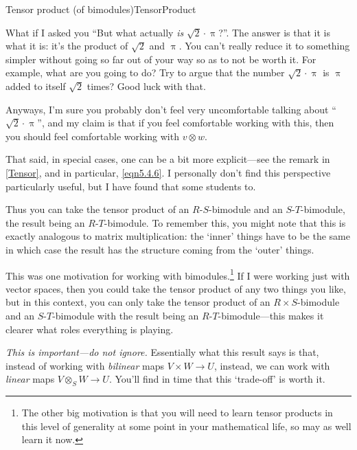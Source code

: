 \begin{thm}{Tensor product (of bimodules)}{TensorProduct}
\begin{rmk}
		What if I asked you ``But what actually \emph{is} $\sqrt{2}\cdot \uppi$?''.  The answer is that it is what it is:  it's the product of $\sqrt{2}$ and $\uppi$.  You can't really reduce it to something simpler without going so far out of your way so as to not be worth it.  For example, what are you going to do?  Try to argue that the number $\sqrt{2}\cdot \uppi$ is $\uppi$ added to itself $\sqrt{2}$ times?  Good luck with that.
		
		Anyways, I'm sure you probably don't feel very uncomfortable talking about ``$\sqrt{2}\cdot \uppi$'', and my claim is that if you feel comfortable working with this, then you should feel comfortable working with $v\otimes w$.
		
		That said, in special cases, one can be a bit more explicit---see the remark in \cref{Tensor}, and in particular, \eqref{eqn5.4.6}.  I personally don't find this perspective particularly useful, but I have found that some students to.
	\end{rmk}
	\begin{rmk}
		Thus you can take the tensor product of an $R$-$S$-bimodule and an $S$-$T$-bimodule, the result being an $R$-$T$-bimodule.  To remember this, you might note that this is exactly analogous to matrix multiplication:  the `inner' things have to be the same in which case the result has the structure coming from the `outer' things.
		
		This was one motivation for working with bimodules.\footnote{The other big motivation is that you will need to learn tensor products in this level of generality at some point in your mathematical life, so may as well learn it now.}  If I were working just with vector spaces, then you could take the tensor product of any two things you like, but in this context, you can only take the tensor product of an $R\times S$-bimodule and an $S$-$T$-bimodule with the result being an $R$-$T$-bimodule---this makes it clearer what roles everything is playing. 
	\end{rmk}
	\begin{rmk}
		\emph{This is important---do not ignore.}  Essentially what this result says is that, instead of working with \emph{bilinear} maps $V\times W\rightarrow U$, instead, we can work with \emph{linear} maps $V\otimes _SW\rightarrow U$.  You'll find in time that this `trade-off' is worth it.
		

\end{rmk}
\end{thm}
